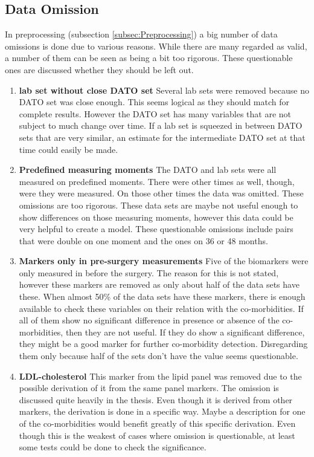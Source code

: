 \documentclass[10pt,a4paper]{article}
\begin{document}
	\subsection{Data Omission}
	
	In preprocessing (subsection \ref{subsec:Preprocessing}) a big number of data omissions is done due to various reasons. While there are many regarded as valid, a number of them can be seen as being a bit too rigorous. These questionable ones are discussed whether they should be left out.
	
	\begin{enumerate}
		\item \textbf{lab set without close DATO set} Several lab sets were removed because no DATO set was close enough. This seems logical as they should match for complete results. However the DATO set has many variables that are not subject to much change over time. If a lab set is squeezed in between DATO sets that are very similar, an estimate for the intermediate DATO set at that time could easily be made.
		
		\item \textbf{Predefined measuring moments} The DATO and lab sets were all measured on predefined moments. There were other times as well, though, were they were measured. On those other times the data was omitted. These omissions are too rigorous. These data sets are maybe not useful enough to show differences on those measuring moments, however this data could be very helpful to create a model. These questionable omissions include pairs that were double on one moment and the ones on 36 or 48 months. 
		
		\item \textbf{Markers only in pre-surgery measurements} Five of the biomarkers were only measured in before the surgery. The reason for this is not stated, however these markers are removed as only about half of the data sets have these. When almost 50\% of the data sets have these markers, there is enough available to check these variables on their relation with the co-morbidities. If all of them show no significant difference in presence or absence of the co-morbidities, then they are not useful. If they do show a significant difference, they might be a good marker for further co-morbidity detection. Disregarding them only because half of the sets don't have the value seems questionable.
		
		\item \textbf{LDL-cholesterol} This marker from the lipid panel was removed due to the possible derivation of it from the same panel markers. The omission is discussed quite heavily in the thesis. Even though it is derived from other markers, the derivation is done in a specific way. Maybe a description for one of the co-morbidities would benefit greatly of this specific derivation. Even though this is the weakest of cases where omission is questionable, at least some tests could be done to check the significance.
		
	\end{enumerate}
	
\end{document}
